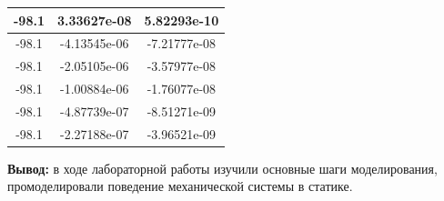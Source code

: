\documentclass[a4paper,14pt]{extarticle}
\begin{document}
\begin{enumerate}[1. ]
\begin{center}
\begin{longtable}{|c|c|c|}
                  \hline
                  -98.1    & 3.33627e-08  & 5.82293e-10  \\
                  \hline
                  -98.1    & -4.13545e-06 & -7.21777e-08 \\
                  \hline
                  -98.1    & -2.05105e-06 & -3.57977e-08 \\
                  \hline
                  -98.1    & -1.00884e-06 & -1.76077e-08 \\
                  \hline
                  -98.1    & -4.87739e-07 & -8.51271e-09 \\
                  \hline
                  \rowcolor{Yellow}
                  -98.1    & -2.27188e-07 & -3.96521e-09 \\
                  \hline
              \end{longtable}
          \end{center}

\end{enumerate}

\textbf{Вывод: } в ходе лабораторной работы изучили основные шаги моделирования,
промоделировали поведение механической системы в статике.
\end{document}
